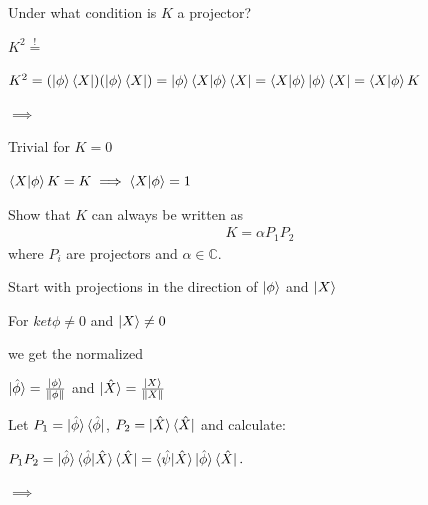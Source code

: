 \documentclass[11pt,a4paper]{scrartcl}
\newcommand{\norm}[1]{\left\lVert #1 \right\rVert}
\begin{document}
\begin{enumerate}
        Under what condition is $K$ a projector? 
        
        \begin{calculationbox}
            $K^2 \stackrel{!}{=}$
            \begin{calculationbox}
                $K^2
                = (\ket{\phi} \bra{X}) (\ket{\phi} \bra{X})
                = \ket{\phi} \braket{X | \phi} \bra{X}
                = \braket{ X | \phi} \ket{\phi} \bra{X}
                = \braket{X | \phi} K
                $
            \end{calculationbox}
            $\implies$
            \begin{calculationbox}
                Trivial for $K = 0 $

                $\braket{X | \phi} K = K \implies \braket{X | \phi} = 1$
            \end{calculationbox}
        \end{calculationbox}

        Show that $K$ can always be written as 
        \begin{align*}
            K = \alpha P_1 P_2
        \end{align*}
        where $P_i$ are projectors and $\alpha \in \mathbb{C}$.

        \begin{calculationbox}
            Start with projections in the direction of $\ket{\phi}$ and $\ket{X}$
            
            \begin{calculationbox}
                For $ket{\phi} \neq 0$ and $\ket{X} \neq 0$

                we get the normalized

                $\ket{\hat{\phi}} = \frac{\ket{\phi}}{\norm{\phi}}$ and 
                $\ket{\hat{X}} = \frac{\ket{X}}{\norm{X}}$
            \end{calculationbox}

            Let $P_1 = \ket{\hat{\phi}} \bra{\hat{\phi}}$,
            $P_2 = \ket{\hat{X}} \bra{\hat{X}}$
            and calculate:
            \begin{calculationbox}

                $P_1 P_2
                = \ket{\hat{\phi}} \braket{\hat{\phi} | \hat{X}} \bra{\hat{X}}
                = \braket{\hat{\psi} | \hat{X}} \ket{\hat{\phi}} \bra{\hat{X}}.
                $

                $\implies$


\end{calculationbox}
\end{calculationbox}
\end{enumerate}
\end{document}
